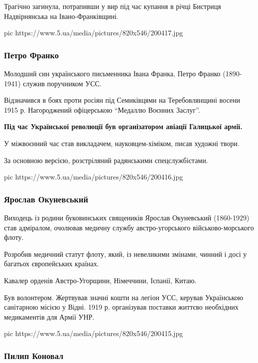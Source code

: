 Трагічно загинула, потрапивши у вир під час купання в річці Бистриця
Надвірнянська на Івано-Франківщині.

\ifcmt
pic https://www.5.ua/media/pictures/820x546/200417.jpg
\fi

\subsubsection{Петро Франко}


Молодший син українського письменника Івана Франка, Петро Франко
(1890-1941) служив поручником УСС.

Відзначився в боях проти росіян під Семиківцями на Теребовлянщині восени
1915 р. Нагороджений офіцерською \enquote{Медаллю Воєнних Заслуг}.

\begin{leftbar}
	\bfseries
Під час Української революції був організатором авіації Галицької армії.
\end{leftbar}

У міжвоєнний час став викладачем, науковцем-хіміком, писав художні твори.

За основною версією, розстріляний радянськими спецслужбістами.

\ifcmt
pic https://www.5.ua/media/pictures/820x546/200416.jpg
\fi

\subsubsection{Ярослав Окуневський}

Виходець із родини буковинських священиків Ярослав Окуневський (1860-1929)
став адміралом, очолював медичну службу австро-угорського
військово-морського флоту.

Розробив медичний статут флоту, який, із невеликими змінами, чинний і
досі у багатьох європейських країнах.

Кавалер орденів Австро-Угорщини, Німеччини, Іспанії, Китаю.

Був волонтером. Жертвував значні кошти на легіон УСС, керував Українською
санітарною місією у Відні. 1919 р. організував поставки життєво необхідних
медикаментів для Армії УНР.

\ifcmt
pic https://www.5.ua/media/pictures/820x546/200415.jpg
\fi

\subsubsection{Пилип Коновал}


